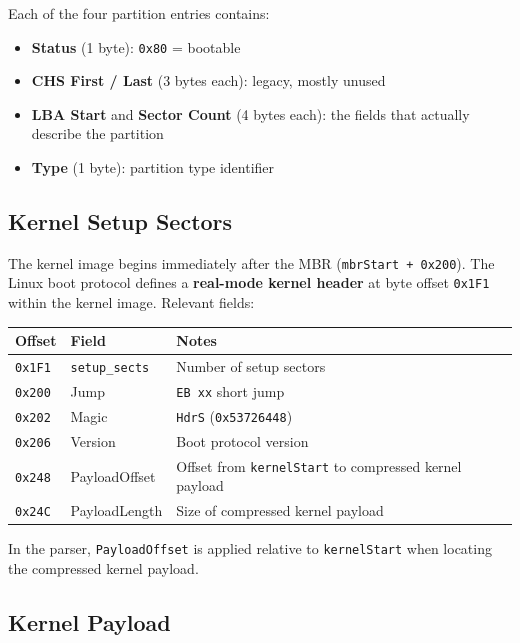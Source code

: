 \documentclass[11pt,a4paper]{article}
\begin{document}
Each of the four partition entries contains:

\begin{itemize}
    \item \textbf{Status} (1 byte): \texttt{0x80} = bootable
    \item \textbf{CHS First / Last} (3 bytes each): legacy, mostly unused
    \item \textbf{LBA Start} and \textbf{Sector Count} (4 bytes each):
          the fields that actually describe the partition
    \item \textbf{Type} (1 byte): partition type identifier
\end{itemize}

\newpage
\subsection{Kernel Setup Sectors}

The kernel image begins immediately after the MBR
(\texttt{mbrStart + 0x200}). The Linux boot protocol defines a
\textbf{real-mode kernel header} at byte offset \texttt{0x1F1} within the
kernel image. Relevant fields:

\begin{center}
\begin{tabular}{lll}
\toprule
\textbf{Offset} & \textbf{Field} & \textbf{Notes} \\
\midrule
\texttt{0x1F1} & \texttt{setup\_sects} & Number of setup sectors \\
\texttt{0x200} & Jump              & \texttt{EB xx} short jump \\
\texttt{0x202} & Magic             & \texttt{HdrS} (\texttt{0x53726448}) \\
\texttt{0x206} & Version           & Boot protocol version \\
\texttt{0x248} & PayloadOffset     & Offset from \texttt{kernelStart} to compressed kernel payload \\
\texttt{0x24C} & PayloadLength     & Size of compressed kernel payload \\
\bottomrule
\end{tabular}
\end{center}

In the parser, \texttt{PayloadOffset} is applied relative to
\texttt{kernelStart} when locating the compressed kernel payload.

\subsection{Kernel Payload}
\end{document}
